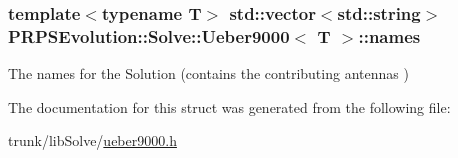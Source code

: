 \hypertarget{struct_p_r_p_s_evolution_1_1_solve_1_1_ueber9000_aeeae8701a298a155f40159d87038acb1}{
\subsubsection[{names}]{\setlength{\rightskip}{0pt plus 5cm}template$<$typename \-T$>$ std\-::vector$<$std\-::string$>$ {\bf \-P\-R\-P\-S\-Evolution\-::\-Solve\-::\-Ueber9000}$<$ \-T $>$\-::{\bf names}}}\label{struct_p_r_p_s_evolution_1_1_solve_1_1_ueber9000_aeeae8701a298a155f40159d87038acb1}
\-The names for the \-Solution (contains the contributing antennas ) 

\-The documentation for this struct was generated from the following file\-:\begin{DoxyCompactItemize}
\item 
trunk/lib\-Solve/\hyperlink{ueber9000_8h}{ueber9000.\-h}\end{DoxyCompactItemize}

